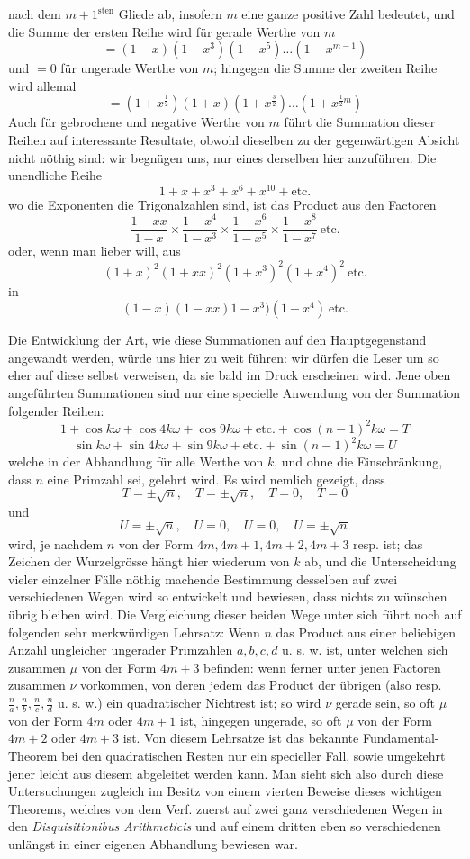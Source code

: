nach dem $m+1^{\mathrm{sten}}$ Gliede ab, insofern $m$ eine ganze positive Zahl bedeutet, und die Summe der ersten Reihe wird für gerade Werthe von $m$
\[
=(1-x)(1-x^3)(1-x^5)\ldots(1-x^{m-1})
\]
und $=0$ für ungerade Werthe von $m$; hingegen die Summe der zweiten Reihe wird allemal
\[
=(1+x^{\frac12})(1+x)(1+x^{\frac32})\ldots(1+x^{\frac12m})
\]
Auch für gebrochene und negative Werthe von $m$ führt die Summation dieser Reihen auf interessante Resultate, obwohl dieselben zu der gegenwärtigen Absicht nicht nöthig sind: wir begnügen uns, nur eines derselben hier anzuführen. Die unendliche Reihe
\[
1+x+x^3+x^6+x^{10}+\text{etc.}
\]
wo die Exponenten die Trigonalzahlen sind, ist das Product aus den Factoren
\[
\frac{1-xx}{1-x}\times\frac{1-x^4}{1-x^3}\times\frac{1-x^6}{1-x^5}\times\frac{1-x^8}{1-x^7}\ \text{etc.}
\]
oder, wenn man lieber will, aus
\[
(1+x)^2(1+xx)^2(1+x^3)^2(1+x^4)^2\ \text{etc.}
\]
in
\[
(1-x)(1-xx)1-x^3)(1-x^4)\ \text{etc.}
\]

Die Entwicklung der Art, wie diese Summationen auf den Hauptgegenstand angewandt werden, würde uns hier zu weit führen: wir dürfen die Leser um so eher auf diese selbst verweisen, da sie bald im Druck erscheinen wird. Jene oben angeführten Summationen sind nur eine specielle Anwendung von der Summation folgender Reihen:
\[
1+\cos k\omega+\cos4k\omega+\cos9k\omega+\text{etc.}+\cos(n-1)^2k\omega=T
\]
\[
\sin k\omega+\sin4k\omega+\sin9k\omega+\text{etc.}+\sin(n-1)^2k\omega=U
\]
welche in der Abhandlung für alle Werthe von $k$, und ohne die Einschränkung,
%
dass $n$ eine Primzahl sei, gelehrt wird. Es wird nemlich gezeigt, dass
\[
T=\pm\surd n,\quad T=\pm\surd n,\quad T=0,\quad T=0
\]
und
\[
U=\pm\surd n,\quad U=0,\quad U=0,\quad U=\pm\surd n
\]
wird, je nachdem $n$ von der Form $4m,4m+1,4m+2,4m+3$ resp. ist; das Zeichen der Wurzelgrösse hängt hier wiederum von $k$ ab, und die Unterscheidung vieler einzelner Fälle nöthig machende Bestimmung desselben auf zwei verschiedenen Wegen wird so entwickelt und bewiesen, dass nichts zu wünschen übrig bleiben wird. Die Vergleichung dieser beiden Wege unter sich führt noch auf folgenden sehr merkwürdigen Lehrsatz: Wenn $n$ das Product aus einer beliebigen Anzahl ungleicher ungerader Primzahlen $a,b,c,d$ u. s. w. ist, unter welchen sich zusammen $\mu$ von der Form $4m+3$ befinden: wenn ferner unter jenen Factoren zusammen $\nu$ vorkommen, von deren jedem das Product der übrigen (also resp. $\frac na,\frac nb,\frac nc,\frac nd$ u. s. w.) ein quadratischer Nichtrest ist; so wird $\nu$ gerade sein, so oft $\mu$ von der Form $4m$ oder $4m+1$ ist, hingegen ungerade, so oft $\mu$ von der Form $4m+2$ oder $4m+3$ ist. Von diesem Lehrsatze ist das bekannte Fundamental-Theorem bei den quadratischen Resten nur ein specieller Fall, sowie umgekehrt jener leicht aus diesem abgeleitet werden kann. Man sieht sich also durch diese Untersuchungen zugleich im Besitz von einem vierten Beweise dieses wichtigen Theorems, welches von dem Verf. zuerst auf zwei ganz verschiedenen Wegen in den \emph{Disquisitionibus Arithmeticis} und auf einem dritten eben so verschiedenen unlängst in einer eigenen Abhandlung bewiesen war.
